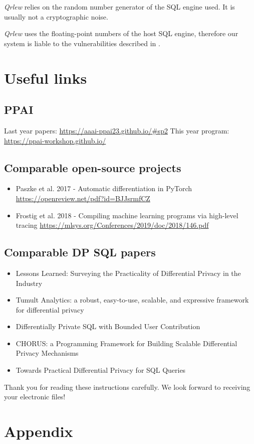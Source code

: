\documentclass[letterpaper]{article} %
\newcommand{\qrlew}{\emph{Qrlew}}
\begin{document}
\qrlew{} relies on the random number generator of the SQL engine used. It is usually not a cryptographic noise.

\qrlew{} uses the floating-point numbers of the host SQL engine, therefore our system is liable to the vulnerabilities described in \citeauthor{casacuberta2022widespread}.


\section*{Useful links}
\subsection{PPAI}
Last year papers:
\url{https://aaai-ppai23.github.io/#sp2}
This year program:
\url{https://ppai-workshop.github.io/}

\subsection{Comparable open-source projects}

\begin{itemize}
    \item Paszke et al. 2017 - Automatic differentiation in PyTorch \url{https://openreview.net/pdf?id=BJJsrmfCZ}
    \item Frostig et al. 2018 - Compiling machine learning programs via high-level tracing \url{https://mlsys.org/Conferences/2019/doc/2018/146.pdf}
\end{itemize}

\subsection{Comparable DP SQL papers}

\begin{itemize}
    \item Lessons Learned: Surveying the Practicality of Differential Privacy in the Industry \cite{garrido2022lessons}
    \item Tumult Analytics: a robust, easy-to-use, scalable, and expressive framework for differential privacy \cite{berghel2022tumult}
    \item Differentially Private SQL with Bounded User Contribution \cite{wilson2019differentially}
    \item CHORUS: a Programming Framework for Building Scalable Differential Privacy Mechanisms \cite{johnson2020chorus}
    \item Towards Practical Differential Privacy for SQL Queries \cite{johnson2018towards}
\end{itemize}

\bigskip
\noindent Thank you for reading these instructions carefully. We look forward to receiving your electronic files!

% 

\appendix

\section*{Appendix}


\end{document}
